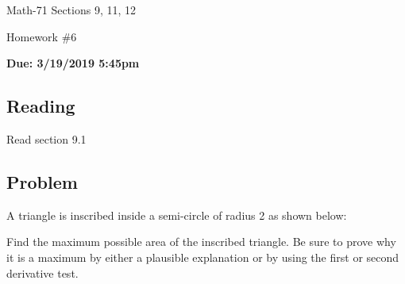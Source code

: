 \documentclass[letterpaper,12pt,fleqn]{article}
\begin{document}
\begin{center}
  \large
  Math-71 Sections 9, 11, 12

  \Large
  Homework \#6

  \large
  \textbf{Due: 3/19/2019 5:45pm}
\end{center}

\subsection*{Reading}

Read section 9.1

\subsection*{Problem}

A triangle is inscribed inside a semi-circle of radius 2 as shown below:

\bigskip

\begin{center}
\end{center}

\bigskip

Find the maximum possible area of the inscribed triangle.  Be sure to prove why it is a maximum by either a plausible
explanation or by using the first or second derivative test.
\end{document}
